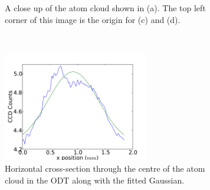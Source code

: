 \begin{figure}[h]
    \begin{subfigure}[b]{0.5\textwidth}\centering
\caption{A close up of the atom cloud shown in (a). The top left corner of this image is the origin for (c) and (d).}
    \end{subfigure}~~~\begin{subfigure}[b]{0.5\textwidth}
        \centering
        \includegraphics[width=0.7\textwidth]{figs/ODTimage1x.pdf}
        \caption{Horizontal cross-section through the centre of the atom cloud in the ODT along with the fitted Gaussian.}
    \end{subfigure}

    \caption{}
    \label{fig:ODTimage1}
\end{figure}


